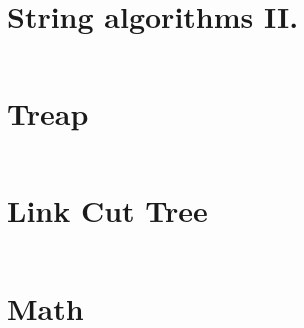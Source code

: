 \documentclass[12pt,english]{article}
\begin{document}
\section{String algorithms II.}
\inputminted[autogobble,breaklines,mathescape,linenos,numbersep=5pt,xleftmargin=0pt,fontsize=\footnotesize]{cpp}{codes/suff_arr.tex}

\section{Treap}
\inputminted[autogobble,breaklines,mathescape,linenos,numbersep=5pt,xleftmargin=0pt,fontsize=\footnotesize]{cpp}{codes/treap.tex}

\section{Link Cut Tree}
\inputminted[autogobble,breaklines,mathescape,linenos,numbersep=5pt,xleftmargin=0pt,fontsize=\footnotesize]{cpp}{codes/link_cut_tree.tex}

\section{Math}
\inputminted[autogobble,breaklines,mathescape,linenos,numbersep=5pt,xleftmargin=0pt,fontsize=\footnotesize]{cpp}{codes/extra_math.tex}

\end{document}
